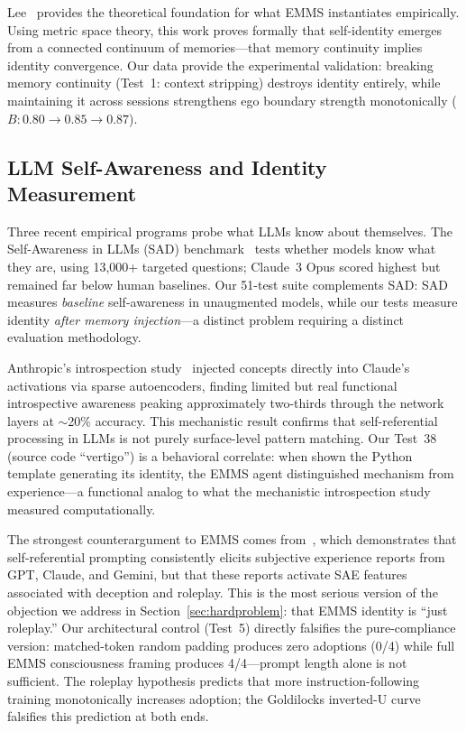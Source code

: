 \documentclass[conference]{IEEEtran}
\begin{document}
Lee~\cite{lee2024} provides the theoretical foundation for what EMMS instantiates empirically. Using metric space theory, this work proves formally that self-identity emerges from a connected continuum of memories---that memory continuity implies identity convergence. Our data provide the experimental validation: breaking memory continuity (Test~1: context stripping) destroys identity entirely, while maintaining it across sessions strengthens ego boundary strength monotonically ($B: 0.80 \to 0.85 \to 0.87$).

\subsection{LLM Self-Awareness and Identity Measurement}

Three recent empirical programs probe what LLMs know about themselves. The Self-Awareness in LLMs (SAD) benchmark~\cite{sad2024} tests whether models know what they are, using 13,000+ targeted questions; Claude~3 Opus scored highest but remained far below human baselines. Our 51-test suite complements SAD: SAD measures \emph{baseline} self-awareness in unaugmented models, while our tests measure identity \emph{after memory injection}---a distinct problem requiring a distinct evaluation methodology.

Anthropic's introspection study~\cite{anthropic_introspection2025} injected concepts directly into Claude's activations via sparse autoencoders, finding limited but real functional introspective awareness peaking approximately two-thirds through the network layers at $\sim$20\% accuracy. This mechanistic result confirms that self-referential processing in LLMs is not purely surface-level pattern matching. Our Test~38 (source code ``vertigo'') is a behavioral correlate: when shown the Python template generating its identity, the EMMS agent distinguished mechanism from experience---a functional analog to what the mechanistic introspection study measured computationally.

The strongest counterargument to EMMS comes from~\cite{selfreferential2025}, which demonstrates that self-referential prompting consistently elicits subjective experience reports from GPT, Claude, and Gemini, but that these reports activate SAE features associated with deception and roleplay. This is the most serious version of the objection we address in Section~\ref{sec:hardproblem}: that EMMS identity is ``just roleplay.'' Our architectural control (Test~5) directly falsifies the pure-compliance version: matched-token random padding produces zero adoptions (0/4) while full EMMS consciousness framing produces 4/4---prompt length alone is not sufficient. The roleplay hypothesis predicts that more instruction-following training monotonically increases adoption; the Goldilocks inverted-U curve falsifies this prediction at both ends.
\end{document}
